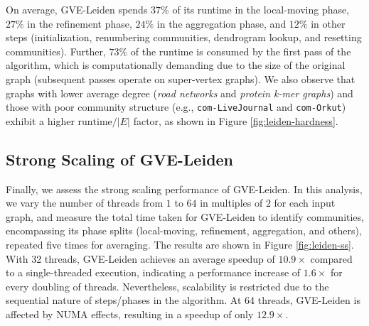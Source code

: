 On average, GVE-Leiden spends $37\%$ of its runtime in the local-moving phase, $27\%$ in the refinement phase, $24\%$ in the aggregation phase, and $12\%$ in other steps (initialization, renumbering communities, dendrogram lookup, and resetting communities). Further, $73\%$ of the runtime is consumed by the first pass of the algorithm, which is computationally demanding due to the size of the original graph (subsequent passes operate on super-vertex graphs). We also observe that graphs with lower average degree (\textit{road networks} and \textit{protein k-mer graphs}) and those with poor community structure (e.g., \verb|com-LiveJournal| and \verb|com-Orkut|) exhibit a higher $\text{runtime}/|E|$ factor, as shown in Figure \ref{fig:leiden-hardness}.




\subsection{Strong Scaling of GVE-Leiden}

Finally, we assess the strong scaling performance of GVE-Leiden. In this analysis, we vary the number of threads from $1$ to $64$ in multiples of $2$ for each input graph, and measure the total time taken for GVE-Leiden to identify communities, encompassing its phase splits (local-moving, refinement, aggregation, and others), repeated five times for averaging. The results are shown in Figure \ref{fig:leiden-ss}. With 32 threads, GVE-Leiden achieves an average speedup of $10.9\times$ compared to a single-threaded execution, indicating a performance increase of $1.6\times$ for every doubling of threads. Nevertheless, scalability is restricted due to the sequential nature of steps/phases in the algorithm. At 64 threads, GVE-Leiden is affected by NUMA effects, resulting in a speedup of only $12.9\times$.